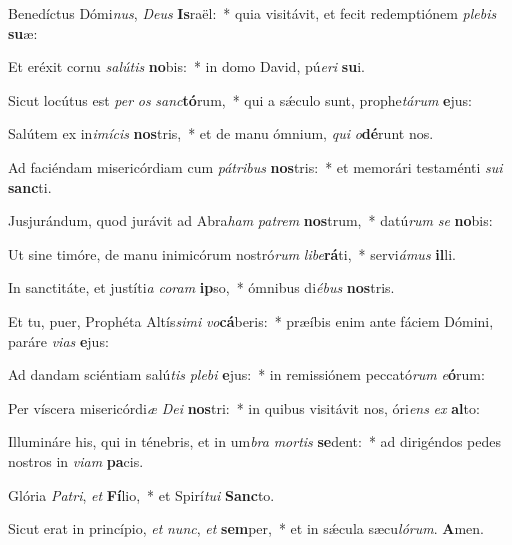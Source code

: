 \item Benedíctus Dómi\textit{nus}, \textit{Deus} \textbf{Is}raël:~* quia visitávit, et fecit redemptiónem \textit{plebis} \textbf{su}æ:

\item Et eréxit cornu \textit{salútis} \textbf{no}bis:~* in domo David, pú\textit{eri} \textbf{su}i.

\item Sicut locútus est \textit{per} \textit{os} \textit{sanc}\textbf{tó}rum,~* qui a sǽculo sunt, prophe\textit{tárum} \textbf{e}jus:

\item Salútem ex in\textit{imícis} \textbf{nos}tris,~* et de manu ómnium, \textit{qui} \textit{o}\textbf{dé}runt nos.

\item Ad faciéndam misericórdiam cum \textit{pátribus} \textbf{nos}tris:~* et memorári testaménti \textit{sui} \textbf{sanc}ti.

\item Jusjurándum, quod jurávit ad Abra\textit{ham} \textit{patrem} \textbf{nos}trum,~* datú\textit{rum} \textit{se} \textbf{no}bis:

\item Ut sine timóre, de manu inimicórum nostró\textit{rum} \textit{libe}\textbf{rá}ti,~* servi\textit{ámus} \textbf{il}li.

\item In sanctitáte, et justíti\textit{a} \textit{coram} \textbf{ip}so,~* ómnibus di\textit{ébus} \textbf{nos}tris.

\item Et tu, puer, Prophéta Altís\textit{simi} \textit{vo}\textbf{cá}beris:~* præíbis enim ante fáciem Dómini, paráre \textit{vias} \textbf{e}jus:

\item Ad dandam sciéntiam salú\textit{tis} \textit{plebi} \textbf{e}jus:~* in remissiónem peccató\textit{rum} \textit{e}\textbf{ó}rum:

\item Per víscera misericórdi\textit{æ} \textit{Dei} \textbf{nos}tri:~* in quibus visitávit nos, óri\textit{ens} \textit{ex} \textbf{al}to:

\item Illumináre his, qui in ténebris, et in um\textit{bra} \textit{mortis} \textbf{se}dent:~* ad dirigéndos pedes nostros in \textit{viam} \textbf{pa}cis.

\item Glória \textit{Patri}, \textit{et} \textbf{Fí}lio,~* et Spirí\textit{tui} \textbf{Sanc}to.

\item Sicut erat in princípio, \textit{et} \textit{nunc}, \textit{et} \textbf{sem}per,~* et in sǽcula sæcu\textit{lórum}. \textbf{A}men.

